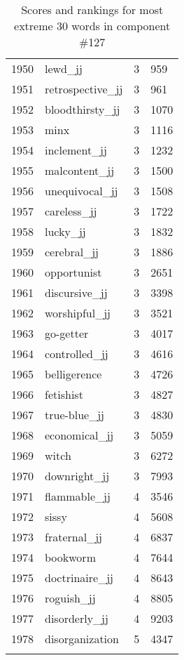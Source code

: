 \begin{longtable}[!htbp]{| rlr@{.}l |}
    1950 & lewd\_jj & 3 & 959 \\
    1951 & retrospective\_jj & 3 & 961 \\
    1952 & bloodthirsty\_jj & 3 & 1070 \\
    1953 & minx & 3 & 1116 \\
    1954 & inclement\_jj & 3 & 1232 \\
    1955 & malcontent\_jj & 3 & 1500 \\
    1956 & unequivocal\_jj & 3 & 1508 \\
    1957 & careless\_jj & 3 & 1722 \\
    1958 & lucky\_jj & 3 & 1832 \\
    1959 & cerebral\_jj & 3 & 1886 \\
    1960 & opportunist & 3 & 2651 \\
    1961 & discursive\_jj & 3 & 3398 \\
    1962 & worshipful\_jj & 3 & 3521 \\
    1963 & go-getter & 3 & 4017 \\
    1964 & controlled\_jj & 3 & 4616 \\
    1965 & belligerence & 3 & 4726 \\
    1966 & fetishist & 3 & 4827 \\
    1967 & true-blue\_jj & 3 & 4830 \\
    1968 & economical\_jj & 3 & 5059 \\
    1969 & witch & 3 & 6272 \\
    1970 & downright\_jj & 3 & 7993 \\
    1971 & flammable\_jj & 4 & 3546 \\
    1972 & sissy & 4 & 5608 \\
    1973 & fraternal\_jj & 4 & 6837 \\
    1974 & bookworm & 4 & 7644 \\
    1975 & doctrinaire\_jj & 4 & 8643 \\
    1976 & roguish\_jj & 4 & 8805 \\
    1977 & disorderly\_jj & 4 & 9203 \\
    1978 & disorganization & 5 & 4347 \\
    \hline
    \caption{Scores and rankings for most extreme 30 words in component \#127} \\
\end{longtable}
